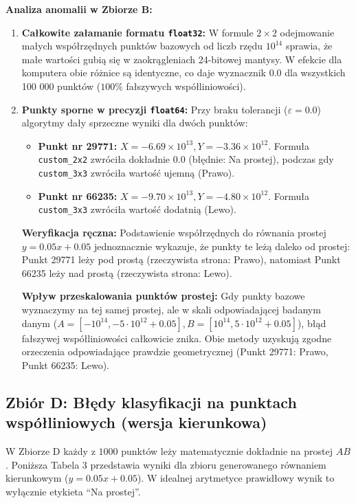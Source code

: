 \documentclass[10pt,a4paper]{article}
\begin{document}
\textbf{Analiza anomalii w Zbiorze B:}
\begin{enumerate}
    \item \textbf{Całkowite załamanie formatu \texttt{float32}:} W formule $2 \times 2$ odejmowanie małych współrzędnych punktów bazowych od liczb rzędu $10^{14}$ sprawia, że małe wartości gubią się w zaokrągleniach 24-bitowej mantysy. W efekcie dla komputera obie różnice są identyczne, co daje wyznacznik $0.0$ dla wszystkich 100 000 punktów ($100\%$ fałszywych współliniowości).
    \item \textbf{Punkty sporne w precyzji \texttt{float64}:} Przy braku tolerancji ($\varepsilon = 0.0$) algorytmy dały sprzeczne wyniki dla dwóch punktów:
    \begin{itemize}
        \item \textbf{Punkt nr 29771:} $X = -6.69 \times 10^{13}, Y = -3.36 \times 10^{12}$. Formuła \texttt{custom\_2x2} zwróciła dokładnie $0.0$ (błędnie: Na prostej), podczas gdy \texttt{custom\_3x3} zwróciła wartość ujemną (Prawo).
        \item \textbf{Punkt nr 66235:} $X = -9.70 \times 10^{13}, Y = -4.80 \times 10^{12}$. Formuła \texttt{custom\_3x3} zwróciła wartość dodatnią (Lewo).
    \end{itemize}
    \textbf{Weryfikacja ręczna:} Podstawienie współrzędnych do równania prostej $y = 0.05x + 0.05$ jednoznacznie wykazuje, że punkty te leżą daleko od prostej: Punkt 29771 leży pod prostą (rzeczywista strona: Prawo), natomiast Punkt 66235 leży nad prostą (rzeczywista strona: Lewo).

    \textbf{Wpływ przeskalowania punktów prostej:} Gdy punkty bazowe wyznaczymy na tej samej prostej, ale w skali odpowiadającej badanym danym ($A = [-10^{14}, -5 \cdot 10^{12} + 0.05], B = [10^{14}, 5 \cdot 10^{12} + 0.05]$), błąd fałszywej współliniowości całkowicie znika. Obie metody uzyskują zgodne orzeczenia odpowiadające prawdzie geometrycznej (Punkt 29771: Prawo, Punkt 66235: Lewo).
\end{enumerate}

\newpage

\subsection{Zbiór D: Błędy klasyfikacji na punktach współliniowych (wersja kierunkowa)}
W Zbiorze D każdy z $1000$ punktów leży matematycznie dokładnie na prostej $AB$. Poniższa Tabela 3 przedstawia wyniki dla zbioru generowanego równaniem kierunkowym ($y = 0.05x + 0.05$). W idealnej arytmetyce prawidłowy wynik to wyłącznie etykieta ``Na prostej''.
\end{document}
